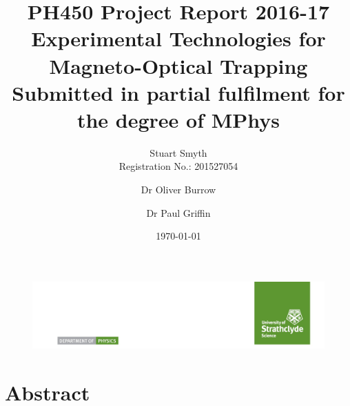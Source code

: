 \documentclass[aps,pra,a4paper,nofootinbib,preprint,12pt]{revtex4-1} %
\newcommand{\projecttitle}{Experimental Technologies for Magneto-Optical Trapping}
\newcommand{\studentname}{Stuart Smyth}
\newcommand{\regnumber}{201527054}
\newcommand{\degree}{MPhys}
\newcommand{\primarysup}{Dr Oliver Burrow}
\newcommand{\secondsup}{Dr Paul Griffin}%
\begin{document}

\begin{figure}
\includegraphics[width=\textwidth]{ScienceLogo.png}
\end{figure}

\title{PH450 Project Report 2016-17\\ \vspace{1cm}
{\huge \projecttitle} %
\\
\vspace{1cm}
{\footnotesize Submitted in partial fulfilment for the degree of \degree}}

\author{\studentname\\
Registration No.: \regnumber}

\vspace{1cm}

\author{\primarysup}

\vspace{1cm}

\author{\secondsup} %


\vspace{1cm}

\date{\today}


\maketitle %



\section*{Abstract}
\end{document}
